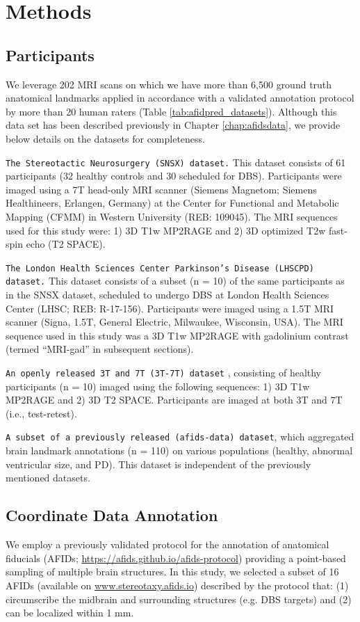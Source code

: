 \section{Methods}

\subsection{Participants}
We leverage 202 MRI scans on which we have more than 6,500 ground truth anatomical landmarks applied in accordance with a validated annotation protocol \cite{Lau2019-eh} by more than 20 human raters (Table \ref{tab:afidpred_datasets}). Although this data set has been described previously in Chapter \ref{chap:afidsdata}, we provide below details on the datasets for completeness. 

\texttt{The Stereotactic Neurosurgery (SNSX) dataset.} This dataset consists of 61 participants (32 healthy controls and 30 scheduled for DBS). Participants were imaged using a 7T head-only MRI scanner (Siemens Magnetom; Siemens Healthineers, Erlangen, Germany) at the Center for Functional and Metabolic Mapping (CFMM) in Western University (REB: 109045). The MRI sequences used for this study were: 1) 3D T1w MP2RAGE and 2) 3D optimized T2w fast-spin echo (T2 SPACE).

\texttt{The London Health Sciences Center Parkinson’s Disease (LHSCPD) dataset.} This dataset consists of a subset (n = 10) of the same participants as in the SNSX dataset, scheduled to undergo DBS at London Health Sciences Center (LHSC; REB: R-17-156). Participants were imaged using a 1.5T MRI scanner (Signa, 1.5T, General Electric, Milwaukee, Wisconsin, USA). The MRI sequence used in this study was a 3D T1w MP2RAGE with gadolinium contrast (termed “MRI-gad” in subsequent sections).

\texttt{An openly released 3T and 7T (3T-7T) dataset} \cite{Chen2023-cn}, consisting of healthy participants (n = 10) imaged using the following sequences: 1) 3D T1w MP2RAGE and 2) 3D T2 SPACE. Participants are imaged at both 3T and 7T (i.e., test-retest).

\texttt{A subset of a previously released (afids-data) dataset}, which aggregated brain landmark annotations (n = 110) on various populations (healthy, abnormal ventricular size, and PD). This dataset is independent of the previously mentioned datasets.

\subsection{Coordinate Data Annotation}
We employ a previously validated protocol for the annotation of anatomical fiducials (AFIDs; \url{https://afids.github.io/afids-protocol}) providing a point-based sampling of multiple brain structures. In this study, we selected a subset of 16 AFIDs (available on \url{www.stereotaxy.afids.io}) described by the protocol that: (1) circumscribe the midbrain and surrounding structures (e.g. DBS targets) and (2) can be localized within 1 mm.

